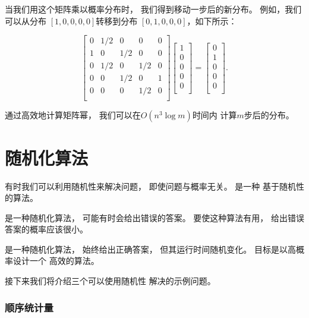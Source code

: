 当我们用这个矩阵乘以概率分布时，
我们得到移动一步后的新分布。
例如，我们可以从分布
$[1,0,0,0,0]$转移到分布
$[0,1,0,0,0]$，如下所示：

\[ 
 \begin{bmatrix}
  0 & 1/2 & 0 & 0 & 0 \\
  1 & 0 & 1/2 & 0 & 0 \\
  0 & 1/2 & 0 & 1/2 & 0 \\
  0 & 0 & 1/2 & 0 & 1 \\
  0 & 0 & 0 & 1/2 & 0 \\
 \end{bmatrix}
 \begin{bmatrix}
  1 \\
  0 \\
  0 \\
  0 \\
  0 \\
 \end{bmatrix}
=
 \begin{bmatrix}
  0 \\
  1 \\
  0 \\
  0 \\
  0 \\
 \end{bmatrix}.
\]

通过高效地计算矩阵幂，
我们可以在$O(n^3 \log m)$时间内
计算$m$步后的分布。

\section{随机化算法}


有时我们可以利用随机性来解决问题，
即使问题与概率无关。
是一种
基于随机性的算法。


是一种随机化算法，
可能有时会给出错误的答案。
要使这种算法有用，
给出错误答案的概率应该很小。


是一种随机化算法，
始终给出正确答案，
但其运行时间随机变化。
目标是以高概率设计一个
高效的算法。

接下来我们将介绍三个可以使用随机性
解决的示例问题。

\subsubsection{顺序统计量}

